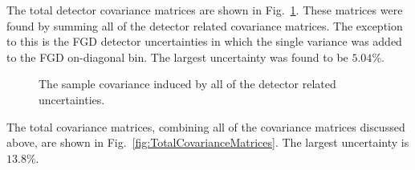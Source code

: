 \newline
\newline
The total detector covariance matrices are shown in Fig.~\ref{fig:DetectorCovarianceMatrices}.  These matrices were found by summing all of the detector related covariance matrices.  The exception to this is the FGD detector uncertainties in which the single variance was added to the FGD on-diagonal bin.  The largest uncertainty was found to be $5.04\%$.
\begin{figure}%
  \centering
  \caption{The sample covariance induced by all of the detector related uncertainties.}
  \label{fig:DetectorCovarianceMatrices}
\end{figure}
The total covariance matrices, combining all of the covariance matrices discussed above, are shown in Fig.~\ref{fig:TotalCovarianceMatrices}.  The largest uncertainty is $13.8\%$.
